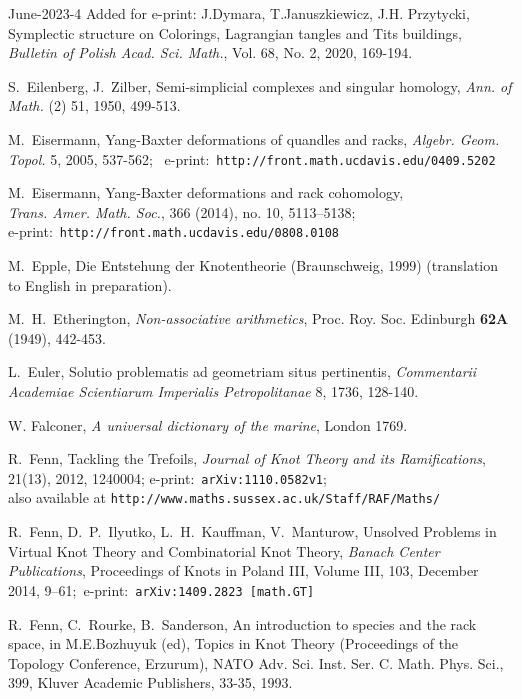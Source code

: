 \documentclass[12pt]{amsart}
\begin{document}
\begin{thebibliography}{June-2023-4}
 {\color{red} Added for e-print:} J.Dymara, T.Januszkiewicz, J.H. Przytycki,
Symplectic structure on Colorings,  Lagrangian tangles and Tits buildings, 
{\it Bulletin of Polish Acad. Sci. Math.},  Vol. 68, No. 2, 2020, 169-194.

S.~Eilenberg, J.~Zilber, Semi-simplicial complexes and singular homology,
{\it Ann. of Math.} (2) 51, 1950, 499-513.

 M.~Eisermann,
Yang-Baxter deformations of quandles and racks, {\it Algebr. Geom. Topol.} 5, 2005, 537-562; \
e-print:\ {\tt http://front.math.ucdavis.edu/0409.5202 }

 M.~Eisermann,
Yang-Baxter deformations and rack cohomology,\\ {\it Trans. Amer. Math. Soc.},  366 (2014), no. 10, 5113–5138; \\
e-print:\ {\tt http://front.math.ucdavis.edu/0808.0108}


M.~Epple,
Die Entstehung der Knotentheorie (Braunschweig, 1999)
(translation to English in preparation).

M.~H.~Etherington, {\it Non-associative arithmetics}, Proc. Roy. Soc. Edinburgh \textbf{62A} (1949), 442-453.

L.~Euler,   Solutio problematis ad geometriam situs pertinentis,
{\it Commentarii Academiae Scientiarum Imperialis Petropolitanae}
8, 1736, 128-140.

 W. Falconer, {\it A universal dictionary of the marine},
London 1769.

R.~Fenn, Tackling the Trefoils, {\it Journal of Knot Theory and its Ramifications}, 21(13), 2012, 1240004;
e-print:\ {\tt arXiv:1110.0582v1}; \\
also available at {\tt http://www.maths.sussex.ac.uk/Staff/RAF/Maths/}

R.~Fenn, D.~P.~Ilyutko, L.~H.~Kauffman, V.~Manturow,
Unsolved Problems in Virtual Knot Theory and Combinatorial Knot Theory,
{\it Banach Center Publications}, Proceedings of Knots in Poland III, Volume III, 103, December 2014, 9–61;\
e-print:\ {\tt  arXiv:1409.2823 [math.GT] }

R.~Fenn, C.~Rourke, B.~Sanderson, An introduction to species and the rack space,
in M.E.Bozhuyuk (ed), Topics in Knot Theory (Proceedings of the Topology Conference, Erzurum),
NATO Adv. Sci. Inst. Ser. C. Math. Phys. Sci., 399, Kluver Academic Publishers, 33-35, 1993.


\end{thebibliography}
\end{document}
